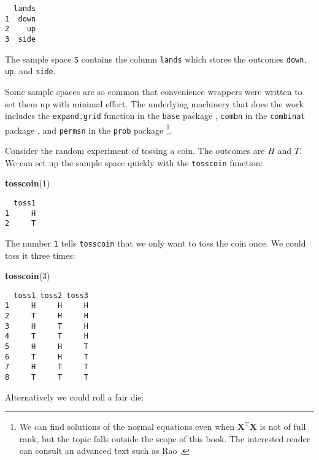 \documentclass[]{book}
\newenvironment{Shaded}{\begin{snugshade}}{\end{snugshade}}
\newcommand{\KeywordTok}[1]{\textcolor[rgb]{0.13,0.29,0.53}{\textbf{{#1}}}}
\newcommand{\DecValTok}[1]{\textcolor[rgb]{0.00,0.00,0.81}{{#1}}}
\newcommand{\NormalTok}[1]{{#1}}
\let\rmarkdownfootnote\footnote%
\def\footnote{\protect\rmarkdownfootnote}
\numberwithin{equation}{chapter}
\numberwithin{figure}{chapter}
\theoremstyle{plain}
\theoremstyle{definition}
\theoremstyle{remark}
\theoremstyle{definition}
\theoremstyle{definition}
\theoremstyle{remark}
\begin{document}
\begin{verbatim}
  lands
1  down
2    up
3  side
\end{verbatim}

The sample space \texttt{S} contains the column \texttt{lands} which
stores the outcomes \texttt{down}, \texttt{up}, and \texttt{side}.

Some sample spaces are so common that convenience wrappers were written
to set them up with minimal effort. The underlying machinery that does
the work includes the \texttt{expand.grid} function in the \texttt{base}
package \autocite{base}, \texttt{combn} in the \texttt{combinat} package
\autocite{combinat}, and \texttt{permsn} in the \texttt{prob} package
\autocite{prob}\footnote{We can find solutions of the normal equations
  even when \(\mathbf{X}^{\mathrm{T}}\mathbf{X}\) is not of full rank,
  but the topic falls outside the scope of this book. The interested
  reader can consult an advanced text such as Rao \autocite{Rao1999}.}.

Consider the random experiment of tossing a coin. The outcomes are \(H\)
and \(T\). We can set up the sample space quickly with the
\texttt{tosscoin} function:

\begin{Shaded}
\begin{Highlighting}[]
\KeywordTok{tosscoin}\NormalTok{(}\DecValTok{1}\NormalTok{)}
\end{Highlighting}
\end{Shaded}

\begin{verbatim}
  toss1
1     H
2     T
\end{verbatim}

The number \texttt{1} tells \texttt{tosscoin} that we only want to toss
the coin once. We could toss it three times:

\begin{Shaded}
\begin{Highlighting}[]
\KeywordTok{tosscoin}\NormalTok{(}\DecValTok{3}\NormalTok{)}
\end{Highlighting}
\end{Shaded}

\begin{verbatim}
  toss1 toss2 toss3
1     H     H     H
2     T     H     H
3     H     T     H
4     T     T     H
5     H     H     T
6     T     H     T
7     H     T     T
8     T     T     T
\end{verbatim}

Alternatively we could roll a fair die:
\end{document}
